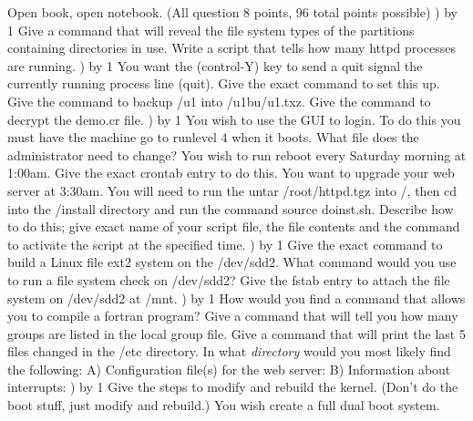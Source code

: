 
\parindent=0in
\nopagenumbers
\newcount\quesno
{}
\def\ques{\number\quesno) \advance\quesno by 1}
\def\aspace{\vskip 1.5in}

Open book, open notebook. (All question 8 points, 96 total points possible)
\hfill\break
\ques
Give a command that will reveal the file system types of
the partitions containing directories in use.
\vskip 0.4in
Write a script that tells how many {\ltt{}httpd} processes are running.
\vskip 1.1in
\ques
You want the ({\ltt{}control-Y}) key to send a quit signal
the currently running process line ({\ltt{}quit}).
Give the exact command to set this up.
\vskip 0.4in
Give the command to backup {\ltt{}/u1} into {\ltt{}/u1bu/u1.txz}.
\vskip 0.4in
Give the command to decrypt the {\ltt{}demo.cr} file.
\vskip 0.4in
\ques
You wish to use the GUI to login. To do this you must have the
machine go to runlevel 4 when it boots.
What file does the administrator need to change?
\vskip 0.4in
You wish to run {\ltt{}reboot} every Saturday morning at 1:00am.
Give the exact crontab entry to do this.
\vskip 1.4in
You want to upgrade your web server at 3:30am.
You will need to run the untar {\ltt{}/root/httpd.tgz} into
{\ltt{}/}, then {\ltt{}cd} into the {\ltt{}/install} directory and
run the command {\ltt{}source doinst.sh}.
Describe how to do this; give exact name of your script file, the file contents
and the command to activate the script at the specified time.
\vskip 1.7in
\vfill\eject
\ques
Give the exact command to build a Linux file ext2 system on the
{\ltt{}/dev/sdd2}.
\vskip 0.4in
What command would you use to run a file system check on
{\ltt{}/dev/sdd2}?
\vskip 0.4in
Give the {\ltt{}fstab} entry to attach the file system
on {\ltt{}/dev/sdd2} at {\ltt{}/mnt}.
\vskip 0.4in
\ques
How would you find a command that allows you to compile a fortran program?
\vskip 0.4in
Give a command that will tell you how many groups are listed in the local
{\ltt{}group} file.
\vskip 0.4in
Give a command that will print the last 5 files changed in the {\ltt{}/etc}
directory.
\vskip 0.4in
In what {\it directory} would you most likely find
the following:
\hfill\break
A) Configuration file(s) for the web server:
\vskip 0.3in
B) Information about interrupts:
\vskip 0.3in
\ques
Give the steps to modify and rebuild the kernel.
(Don't do the boot stuff, just modify and rebuild.)
\vskip 1.5in
You wish create a full dual boot system.
